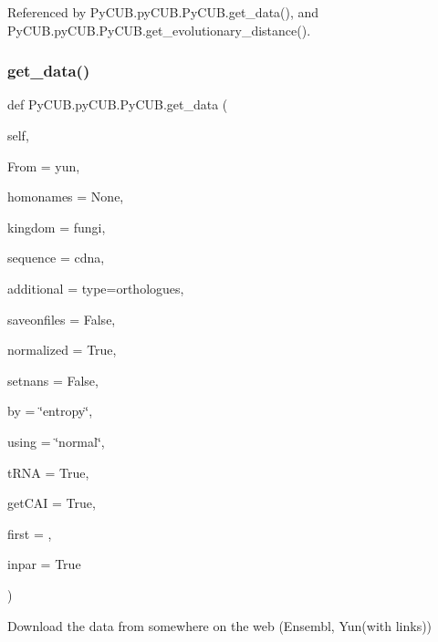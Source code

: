 Referenced by Py\+C\+U\+B.\+py\+C\+U\+B.\+Py\+C\+U\+B.\+get\+\_\+data(), and Py\+C\+U\+B.\+py\+C\+U\+B.\+Py\+C\+U\+B.\+get\+\_\+evolutionary\+\_\+distance().

\mbox{\label{class_py_c_u_b_1_1py_c_u_b_1_1_py_c_u_b_ac4d231f47432a18f84da1cef8673b50b}} 
\subsubsection{\texorpdfstring{get\+\_\+data()}{get\_data()}}
{\footnotesize\ttfamily def Py\+C\+U\+B.\+py\+C\+U\+B.\+Py\+C\+U\+B.\+get\+\_\+data (\begin{DoxyParamCaption}\item[{}]{self,  }\item[{}]{From = {\ttfamily \textquotesingle{}yun\textquotesingle{}},  }\item[{}]{homonames = {\ttfamily None},  }\item[{}]{kingdom = {\ttfamily \textquotesingle{}fungi\textquotesingle{}},  }\item[{}]{sequence = {\ttfamily \textquotesingle{}cdna\textquotesingle{}},  }\item[{}]{additional = {\ttfamily \textquotesingle{}type=orthologues\textquotesingle{}},  }\item[{}]{saveonfiles = {\ttfamily False},  }\item[{}]{normalized = {\ttfamily True},  }\item[{}]{setnans = {\ttfamily False},  }\item[{}]{by = {\ttfamily \char`\"{}entropy\char`\"{}},  }\item[{}]{using = {\ttfamily \char`\"{}normal\char`\"{}},  }\item[{}]{t\+R\+NA = {\ttfamily True},  }\item[{}]{get\+C\+AI = {\ttfamily True},  }\item[{}]{first = {},  }\item[{}]{inpar = {\ttfamily True} }\end{DoxyParamCaption})}



Download the data from somewhere on the web (Ensembl, Yun(with links)) 

